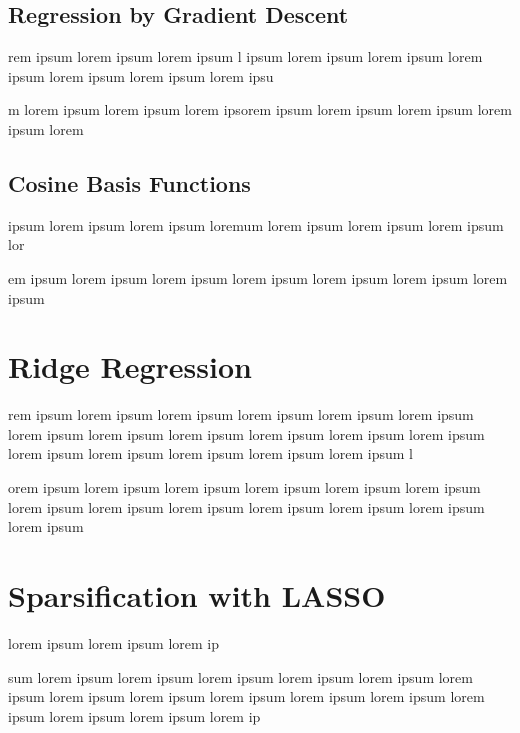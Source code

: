 \documentclass{amsart}
\begin{document}

\subsection{Regression by Gradient Descent}



rem ipsum lorem ipsum lorem ipsum l ipsum lorem ipsum lorem ipsum lorem ipsum lorem ipsum lorem ipsum lorem ipsu

m lorem ipsum lorem ipsum lorem ipsorem ipsum lorem ipsum lorem ipsum lorem ipsum lorem 

\subsection{Cosine Basis Functions}

ipsum lorem ipsum lorem ipsum loremum lorem ipsum lorem ipsum lorem ipsum lor

em ipsum lorem ipsum lorem ipsum lorem ipsum lorem ipsum lorem ipsum lorem ipsum





\section{Ridge Regression}


rem ipsum lorem ipsum lorem ipsum lorem ipsum lorem ipsum lorem ipsum lorem ipsum lorem ipsum lorem ipsum lorem ipsum lorem ipsum lorem ipsum lorem ipsum lorem ipsum lorem ipsum lorem ipsum lorem ipsum l

orem ipsum lorem ipsum lorem ipsum lorem ipsum lorem ipsum lorem ipsum lorem ipsum lorem ipsum lorem ipsum lorem ipsum lorem ipsum lorem ipsum lorem ipsum





\section{Sparsification with LASSO}

lorem ipsum lorem ipsum lorem ip

sum lorem ipsum lorem ipsum lorem ipsum lorem ipsum lorem ipsum lorem ipsum lorem ipsum lorem ipsum lorem ipsum lorem ipsum lorem ipsum lorem ipsum lorem ipsum lorem ipsum lorem ip
\end{document}
